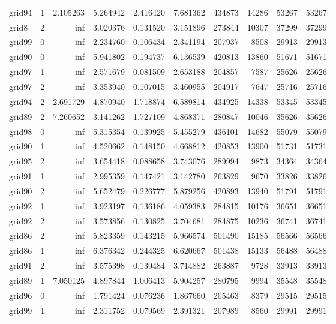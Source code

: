 \begin{longtable}{|l|r|r|r|r|r|r|r|r|r|}
grid94 & 1 & 2.105263 & 5.264942 & 2.416420 & 7.681362 & 434873 & 14286 & 53267 & 53267 \\
grid8 & 2 & inf & 3.020376 & 0.131520 & 3.151896 & 273844 & 10307 & 37299 & 37299 \\
grid99 & 0 & inf & 2.234760 & 0.106434 & 2.341194 & 207937 & 8508 & 29913 & 29913 \\
grid90 & 0 & inf & 5.941802 & 0.194737 & 6.136539 & 420813 & 13860 & 51671 & 51671 \\
grid97 & 1 & inf & 2.571679 & 0.081509 & 2.653188 & 204857 & 7587 & 25626 & 25626 \\
grid97 & 2 & inf & 3.353940 & 0.107015 & 3.460955 & 204917 & 7647 & 25716 & 25716 \\
grid94 & 2 & 2.691729 & 4.870940 & 1.718874 & 6.589814 & 434925 & 14338 & 53345 & 53345 \\
grid89 & 2 & 7.260652 & 3.141262 & 1.727109 & 4.868371 & 280847 & 10046 & 35626 & 35626 \\
grid98 & 0 & inf & 5.315354 & 0.139925 & 5.455279 & 436101 & 14682 & 55079 & 55079 \\
grid90 & 1 & inf & 4.520662 & 0.148150 & 4.668812 & 420853 & 13900 & 51731 & 51731 \\
grid95 & 2 & inf & 3.654418 & 0.088658 & 3.743076 & 289994 & 9873 & 34364 & 34364 \\
grid91 & 1 & inf & 2.995359 & 0.147421 & 3.142780 & 263829 & 9670 & 33826 & 33826 \\
grid90 & 2 & inf & 5.652479 & 0.226777 & 5.879256 & 420893 & 13940 & 51791 & 51791 \\
grid92 & 1 & inf & 3.923197 & 0.136186 & 4.059383 & 284815 & 10176 & 36651 & 36651 \\
grid92 & 2 & inf & 3.573856 & 0.130825 & 3.704681 & 284875 & 10236 & 36741 & 36741 \\
grid86 & 2 & inf & 5.823359 & 0.143215 & 5.966574 & 501490 & 15185 & 56566 & 56566 \\
grid86 & 1 & inf & 6.376342 & 0.244325 & 6.620667 & 501438 & 15133 & 56488 & 56488 \\
grid91 & 2 & inf & 3.575398 & 0.139484 & 3.714882 & 263887 & 9728 & 33913 & 33913 \\
grid89 & 1 & 7.050125 & 4.897844 & 1.006413 & 5.904257 & 280795 & 9994 & 35548 & 35548 \\
grid96 & 0 & inf & 1.791424 & 0.076236 & 1.867660 & 205463 & 8379 & 29515 & 29515 \\
grid99 & 1 & inf & 2.311752 & 0.079569 & 2.391321 & 207989 & 8560 & 29991 & 29991 \\

\end{longtable}
